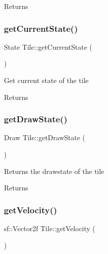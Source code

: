 \begin{DoxyReturn}{Returns}

\end{DoxyReturn}
\mbox{\label{class_tile_a429ce5c06e30fccbc94c5f0a0bcc53c5}} 
\subsubsection{\texorpdfstring{getCurrentState()}{getCurrentState()}}
{\footnotesize\ttfamily State Tile\+::get\+Current\+State (\begin{DoxyParamCaption}{ }\end{DoxyParamCaption})}



Get current state of the tile 

\begin{DoxyReturn}{Returns}

\end{DoxyReturn}
\mbox{\label{class_tile_af8db5d7a281dab571aaec3efbb2758c2}} 
\subsubsection{\texorpdfstring{getDrawState()}{getDrawState()}}
{\footnotesize\ttfamily Draw Tile\+::get\+Draw\+State (\begin{DoxyParamCaption}{ }\end{DoxyParamCaption})}



Returns the drawstate of the tile 

\begin{DoxyReturn}{Returns}

\end{DoxyReturn}
\mbox{\label{class_tile_ad2cc4a02a84288f6c68a15a8e96901ee}} 
\subsubsection{\texorpdfstring{getVelocity()}{getVelocity()}}
{\footnotesize\ttfamily sf\+::\+Vector2f Tile\+::get\+Velocity (\begin{DoxyParamCaption}{ }\end{DoxyParamCaption})}



